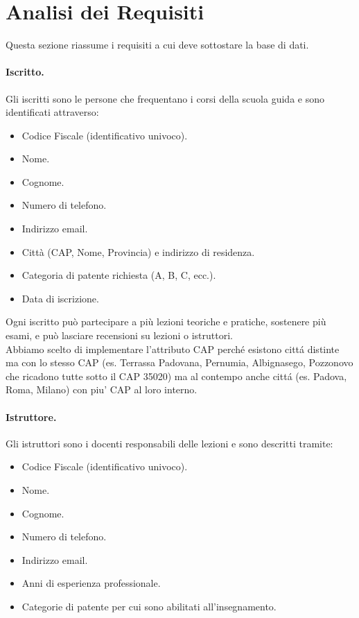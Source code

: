 \documentclass[10pt,twoside]{article}
\begin{document}
\section{Analisi dei Requisiti}{
    \label{sec:analisiRequisiti}
    Questa sezione riassume i requisiti a cui deve sottostare la base di dati.

    \paragraph{Iscritto.}
    Gli iscritti sono le persone che frequentano i corsi della scuola guida e sono identificati attraverso:

    \begin{itemize}
        \item Codice Fiscale (identificativo univoco).
        \item Nome.
        \item Cognome.
        \item Numero di telefono.
        \item Indirizzo email.
        \item Città (CAP, Nome, Provincia) e indirizzo di residenza.
        \item Categoria di patente richiesta (A, B, C, ecc.).
        \item Data di iscrizione.
    \end{itemize}
    
    Ogni iscritto può partecipare a più lezioni teoriche e pratiche, sostenere più esami, e può lasciare recensioni su lezioni o istruttori. \\
    Abbiamo scelto di implementare l'attributo CAP perché esistono cittá distinte ma con lo stesso CAP (es. Terrassa Padovana, Pernumia, Albignasego, Pozzonovo che ricadono tutte sotto il CAP 35020) ma al contempo anche cittá (es. Padova, Roma, Milano) con piu' CAP al loro interno.
    

    \paragraph{Istruttore.}
    Gli istruttori sono i docenti responsabili delle lezioni e sono descritti tramite:
    
    \begin{itemize}
        \item Codice Fiscale (identificativo univoco).
        \item Nome.
        \item Cognome.
        \item Numero di telefono.
        \item Indirizzo email.
        \item Anni di esperienza professionale.
        \item Categorie di patente per cui sono abilitati all’insegnamento.
    \end{itemize}

}
\end{document}
